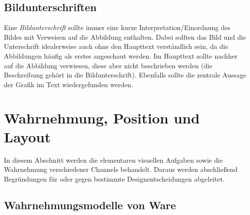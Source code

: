 		\subsection{Bildunterschriften}
			\label{subsec:caption}

			Eine \emph{Bildunterschrift} sollte immer eine kurze Interpretation/Einordnung des Bildes mit Verweisen auf die Abbildung enthalten. Dabei sollten das Bild und die Unterschrift idealerweise auch ohne den Haupttext verständlich sein, da die Abbildungen häufig als erstes angeschaut werden. Im Haupttext sollte nachher auf die Abbildung verwiesen, diese aber nicht beschrieben werden (die Beschreibung gehört in die Bildunterschrift). Ebenfalls sollte die zentrale Aussage der Grafik im Text wiedergefunden werden.

	\section{Wahrnehmung, Position und Layout}
		\label{sec:wahrnehmung}

		In diesem Abschnitt werden die elementaren visuellen Aufgaben sowie die Wahrnehmung verschiedener Channels behandelt. Daraus werden abschließend Begründungen für oder gegen bestimmte Designentscheidungen abgeleitet.

		\subsection{Wahrnehmungsmodelle von Ware}
			\label{subsec:wahrnehmungWare}

